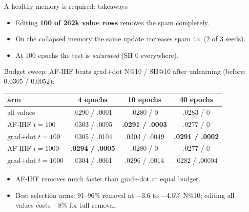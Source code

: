 \documentclass{beamer}
\begin{document}
\begin{frame}{A healthy memory is required: takeaways}
\begin{itemize}
  \item Editing \textbf{100 of 262k value rows} removes the spam completely.
  \item On the collapsed memory the same update \alert{increases spam 4$\times$}
        (2 of 3 seeds).
  \item At 100 epochs the test is \emph{saturated} (SH 0 everywhere).
\end{itemize}
\end{frame}

\begin{frame}{Budget sweep: AF-IHF beats grad+dot}
N@10 / SH@10 after unlearning (before: 0.0305 / 0.0052):
\begin{center}
\small
\begin{tabular}{|l|c|c|c|}
\hline
arm & 4 epochs & 10 epochs & 40 epochs \\
\hline
all values         & .0290 / .0001 & .0280 / 0 & .0283 / 0 \\
AF-IHF $t{=}100$   & .0303 / .0095 & \textbf{.0291 / .0003} & .0277 / 0 \\
grad+dot $t{=}100$ & .0305 / .0104 & .0303 / .0049 & \textbf{.0291 / .0002} \\
AF-IHF $t{=}1000$  & \textbf{.0294 / .0005} & .0280 / 0 & .0277 / 0 \\
grad+dot $t{=}1000$& .0304 / .0061 & .0296 / .0014 & .0282 / .00004 \\
\hline
\end{tabular}
\end{center}

\begin{itemize}
  \item AF-IHF removes much faster than grad+dot at equal budget.
  \item Best selection arms: 91--96\% removal at $-3.6$ to $-4.6\%$ N@10;
        editing all values costs $-8\%$ for full removal.
\end{itemize}
\end{frame}
\end{document}

